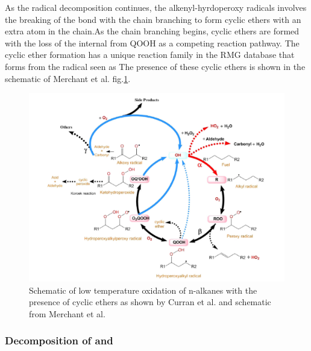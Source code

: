 As the radical decomposition continues, the alkenyl-hyrdoperoxy radicals involves the breaking of the  bond with the chain branching to form cyclic ethers with an extra  atom in the chain.As the chain branching begins, cyclic ethers are formed with the loss of the internal  from QOOH as a competing reaction pathway. The cyclic ether formation has a unique reaction family in the RMG database that forms from the  radical seen as  The presence of these cyclic ethers is shown in the schematic of Merchant et al.\cite{Merchant2015UnderstandingPropane} fig.\ref{fig:cyclic-ethers}. 

\begin{figure}[!ht]
\hspace*{-3cm}
    \centering
    \includegraphics[scale=0.45, keepaspectratio]{images/nalkane-schematic+ROR.png}
    \caption{Schematic of low temperature oxidation of n-alkanes with the presence of cyclic ethers as shown by Curran et al.\cite{Curran1998AOxidation} and schematic from Merchant et al.\cite{Merchant2015UnderstandingPropane}}
    \label{fig:cyclic-ethers}
\end{figure}

\cleardoublepage

\subsubsection{Decomposition of  and }

